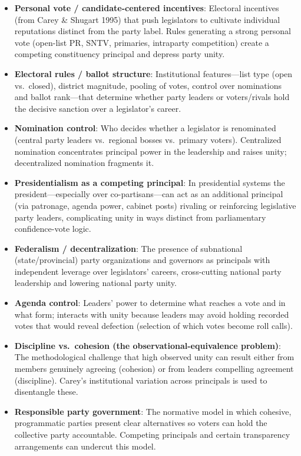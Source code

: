 \documentclass[12pt]{article}
\begin{document}
\begin{itemize}[leftmargin=*, itemsep=4pt]
    \item \textbf{Personal vote / candidate-centered incentives}: Electoral incentives (from Carey \& Shugart 1995) that push legislators to cultivate individual reputations distinct from the party label. Rules generating a strong personal vote (open-list PR, SNTV, primaries, intraparty competition) create a competing constituency principal and depress party unity.
    \item \textbf{Electoral rules / ballot structure}: Institutional features---list type (open vs.\ closed), district magnitude, pooling of votes, control over nominations and ballot rank---that determine whether party leaders or voters/rivals hold the decisive sanction over a legislator's career.
    \item \textbf{Nomination control}: Who decides whether a legislator is renominated (central party leaders vs.\ regional bosses vs.\ primary voters). Centralized nomination concentrates principal power in the leadership and raises unity; decentralized nomination fragments it.
    \item \textbf{Presidentialism as a competing principal}: In presidential systems the president---especially over co-partisans---can act as an additional principal (via patronage, agenda power, cabinet posts) rivaling or reinforcing legislative party leaders, complicating unity in ways distinct from parliamentary confidence-vote logic.
    \item \textbf{Federalism / decentralization}: The presence of subnational (state/provincial) party organizations and governors as principals with independent leverage over legislators' careers, cross-cutting national party leadership and lowering national party unity.
    \item \textbf{Agenda control}: Leaders' power to determine what reaches a vote and in what form; interacts with unity because leaders may avoid holding recorded votes that would reveal defection (selection of which votes become roll calls).
    \item \textbf{Discipline vs.\ cohesion (the observational-equivalence problem)}: The methodological challenge that high observed unity can result either from members genuinely agreeing (cohesion) or from leaders compelling agreement (discipline). Carey's institutional variation across principals is used to disentangle these.
    \item \textbf{Responsible party government}: The normative model in which cohesive, programmatic parties present clear alternatives so voters can hold the collective party accountable. Competing principals and certain transparency arrangements can undercut this model.
\end{itemize}
\end{document}
